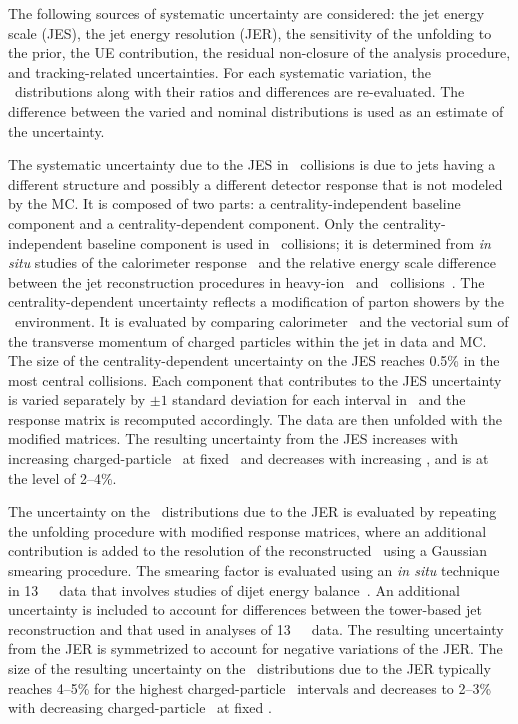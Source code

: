 
The following sources of systematic uncertainty are considered: the jet energy scale (JES), the jet energy resolution (JER), the sensitivity of the  unfolding to the prior, the UE contribution, the residual non-closure of the analysis procedure, and tracking-related uncertainties.
For each systematic variation, the \Dptr\ distributions along with their ratios and differences are re-evaluated.
The difference between the varied and nominal distributions is used as an estimate of the uncertainty.


The systematic uncertainty due to the JES in \PbPb\ collisions is due to jets having a different structure and possibly a different detector response that is not modeled by the MC.
It is composed of two parts: a centrality-independent baseline component and a centrality-dependent component.
Only the centrality-independent baseline component is used in \pp\ collisions; it is determined from \textit{in situ} studies of the calorimeter response~\cite{Aad:2011he,HIjesnote,Aaboud:2017jcu} and the relative energy scale difference between the jet reconstruction procedures in heavy-ion~\cite{HIjesnote} and \pp\ collisions~\cite{Aad:2014bia}.
The centrality-dependent uncertainty reflects a modification of parton showers by the \PbPb\ environment.
It is evaluated by comparing calorimeter \ptjet\ and the vectorial sum of the transverse momentum of charged particles within the jet in data and MC.
The size of the centrality-dependent uncertainty on the JES reaches 0.5\% in the most central collisions.
Each component that contributes to the JES uncertainty is varied separately by $\pm1$ standard deviation for each interval in \ptjet\ and the response matrix is recomputed accordingly.
The data are then unfolded with the modified matrices.
The resulting uncertainty from the JES increases with increasing charged-particle \pT\ at fixed \ptjet\ and decreases with increasing \ptjet, and is at the level of 2--4\%.


The uncertainty on the \Dptr\ distributions due to the JER is evaluated by repeating the unfolding procedure with modified response matrices, where an additional contribution is added to the resolution of the reconstructed \ptjet\ using a Gaussian smearing procedure.
The smearing factor is evaluated using an \textit{in situ} technique in 13~\TeV\ \pp\ data that involves studies of dijet energy balance~\cite{Aad:2012ag,JERConfNote}.
An additional uncertainty is included to account for differences between the tower-based jet reconstruction and that used in analyses of 13~\TeV\ \pp\ data.
The resulting uncertainty from the JER is symmetrized to account for negative variations of the JER.
The size of the resulting uncertainty on the \Dptr\ distributions due to the JER typically reaches 4--5\% for the highest charged-particle \pT\ intervals and decreases to 2--3\% with decreasing charged-particle \pT\ at fixed \ptjet.


